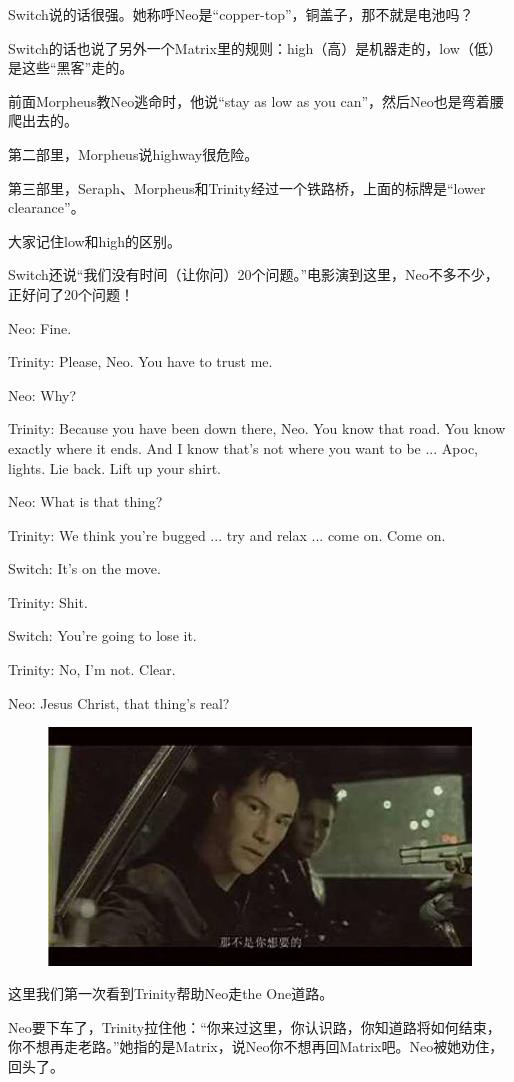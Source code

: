 \documentclass{ctexart}
\newenvironment{myquote}{\color{green} \setlength{\leftskip}{6em} \setlength{\rightskip}{4em} \setlength{\parindent}{-2em}}{\par}
\begin{document}
Switch说的话很强。她称呼Neo是“copper-top”，铜盖子，那不就是电池吗？

Switch的话也说了另外一个Matrix里的规则：high（高）是机器走的，low（低）是这些“黑客”走的。

前面Morpheus教Neo逃命时，他说“stay as low as you can”，然后Neo也是弯着腰爬出去的。

第二部里，Morpheus说highway很危险。

第三部里，Seraph、Morpheus和Trinity经过一个铁路桥，上面的标牌是“lower clearance”。

大家记住low和high的区别。

Switch还说“我们没有时间（让你问）20个问题。”电影演到这里，Neo不多不少，正好问了20个问题！

\begin{myquote}
Neo: Fine.

Trinity: Please, Neo. You have to trust me.

Neo: Why?

Trinity: Because you have been down there, Neo. You know that road. You know exactly where it ends. And I know that's not where you want to be ... Apoc, lights. Lie back. Lift up your shirt.

Neo: What is that thing?

Trinity: We think you're bugged ... try and relax ... come on. Come on.

Switch: It's on the move.

Trinity: Shit.

Switch: You're going to lose it.

Trinity: No, I'm not. Clear.

Neo: Jesus Christ, that thing's real?
\end{myquote}

\begin{figure}[htb]
\centering
\includegraphics[width=0.5\linewidth]{fig/read_Matrix-17}
\end{figure}

这里我们第一次看到Trinity帮助Neo走the One道路。

Neo要下车了，Trinity拉住他：“你来过这里，你认识路，你知道路将如何结束，你不想再走老路。”她指的是Matrix，说Neo你不想再回Matrix吧。Neo被她劝住，回头了。
\end{document}
